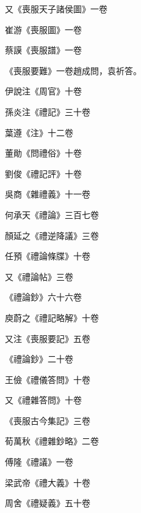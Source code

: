 \begin{pinyinscope}
 又《喪服天子諸侯圖》一卷



 崔游《喪服圖》一卷



 蔡謨《喪服譜》一卷



 《喪服要難》一卷趙成問，袁祈答。



 伊說注《周官》十卷



 孫炎注《禮記》三十卷



 葉遵《注》十二卷



 董勛《問禮俗》十卷



 劉俊《禮記評》十卷



 吳商《雜禮義》十一卷



 何承天《禮論》三百七卷



 顏延之《禮逆降議》三卷



 任預《禮論條牒》十卷



 又《禮論帖》三卷



 《禮論鈔》六十六卷



 庾蔚之《禮記略解》十卷



 又注《喪服要記》五卷



 《禮論鈔》二十卷



 王儉《禮儀答問》十卷



 又《禮雜答問》十卷



 《喪服古今集記》三卷



 荀萬秋《禮雜鈔略》二卷



 傅隆《禮議》一卷



 梁武帝《禮大義》十卷



 周舍《禮疑義》五十卷




\end{pinyinscope}
